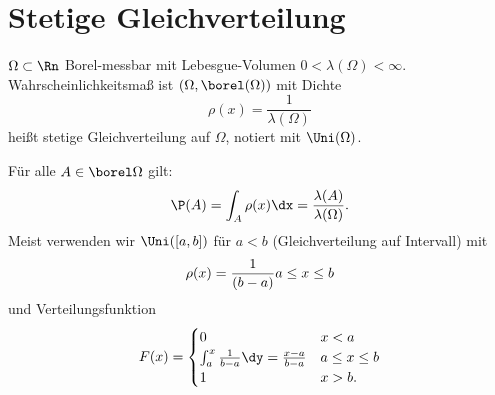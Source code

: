 \section{Stetige Gleichverteilung}

\begin{*erinnerung}
	$\Omega \subset \Rn$ Borel-messbar mit Lebesgue-Volumen $0 < \lambda(\Omega) < \infty$. Wahrscheinlichkeitsmaß ist $(\Omega, \borel(\Omega))$ mit Dichte
	\begin{equation*}
		\rho(x) = \frac{1}{\lambda(\Omega)}
	\end{equation*}
	heißt stetige Gleichverteilung auf $\Omega$, notiert mit $\Uni(\Omega)$.
\end{*erinnerung}

Für alle $A \in \borel\Omega$ gilt:
\begin{equation*}
	\P(A) = \int_{A} \rho(x) \dx = \frac{\lambda(A)}{\lambda(\Omega)}.
\end{equation*}
Meist verwenden wir $\Uni([a,b])$ für $a < b$ (Gleichverteilung auf Intervall) mit \begin{equation*}
	\rho(x) = \frac{1}{(b-a)} \mit a \le x \le b
\end{equation*} 
und Verteilungsfunktion
\begin{equation*}
	F(x) = 
	\begin{cases}
	0 & x < a\\
	\int_{a}^{x} \frac{1}{b-a} \dy = \frac{x-a}{b-a} & a \le x \le b\\
	1 & x >b.
	\end{cases}
\end{equation*}